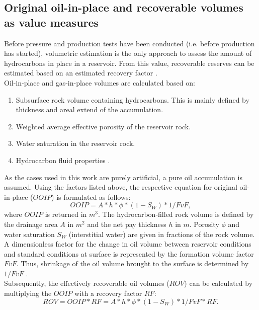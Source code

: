         \subsection{Original oil-in-place and recoverable volumes as value measures}
        Before pressure and production tests have been conducted (i.e. before production has started), volumetric estimation is the only approach to assess the amount of hydrocarbons in place in a reservoir. From this value, recoverable reserves can be estimated based on an estimated recovery factor \citep{dean2007volumetric}.\\
        Oil-in-place and gas-in-place volumes are calculated based on:
        \begin{enumerate}
        \item Subsurface rock volume containing hydrocarbons. This is mainly defined by thickness and areal extend of the accumulation.
        \item Weighted average effective porosity of the reservoir rock.
        \item Water saturation in the reservoir rock.
        \item Hydrocarbon fluid properties \citep{dean2007volumetric}.
        \end{enumerate}
        As the cases used in this work are purely artificial, a pure oil accumulation is assumed. Using the factors listed above, the respective equation for original oil-in-place ($OOIP$) is formulated as follows:
        \begin{equation}\label{eq:OOIP}
        OOIP = A * h * \phi * (1 - S_W) * 1/FvF,
        \end{equation}
        where $OOIP$ is returned in $m^3$. The hydrocarbon-filled rock volume is defined by the drainage area $A$ in $m^2$ and the net pay thickness $h$ in $m$. Porosity $\phi$ and water saturation $S_W$ (interstitial water) are given in fractions of the rock volume. A dimensionless factor for the change in oil volume between reservoir conditions and standard conditions at surface is represented by the formation volume factor $FvF$. Thus, shrinkage of the oil volume brought to the surface is determined by $1/FvF$ \citep{dean2007volumetric}.\\
        Subsequently, the effectively recoverable oil volumes ($ROV$) can be calculated by multiplying the $OOIP$ with a recovery factor $RF$:
        \begin{equation}\label{eq:ROV}
                ROV = OOIP * RF = A * h * \phi * (1 - S_W) * 1/FvF * RF.
        \end{equation}
